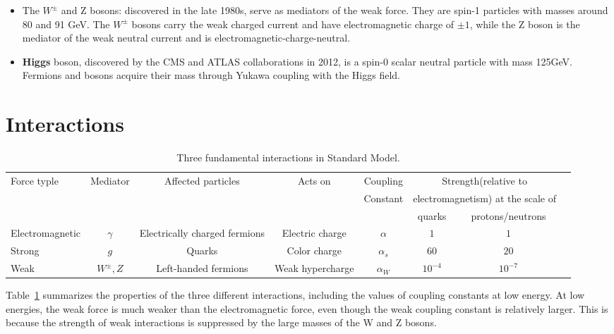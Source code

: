 \begin{itemize}
\begin{itemize}
  \item The $W^{\pm}$ and Z bosons: discovered in the late 1980s, serve as mediators of the weak force. They are spin-1 particles with masses around 80 and 91 GeV. The \textbf{$W^{\pm}$} bosons carry the weak charged current and have electromagnetic charge of $\pm 1$, while the Z boson is the mediator of the weak neutral current and is electromagnetic-charge-neutral. 
    \item \textbf{Higgs} boson, discovered by the CMS and ATLAS collaborations in 2012\cite{Aad:2012tfa}\cite{Chatrchyan:2012xdj}, is a spin-0 scalar neutral particle with mass 125GeV. Fermions and bosons acquire their mass through Yukawa coupling with the Higgs field. 
\end{itemize}
\end{itemize}
 
 

\section{Interactions}
\begin{table}[tbh]
\centering
\tiny
\begin{tabular}{|l|c|c|c|c|c|c|c}

\hline
    Force typle & Mediator & Affected particles & Acts on & Coupling&  \multicolumn{2}{c|}{Strength(relative to }\\
    &&&&Constant &\multicolumn{2}{c|}{electromagnetism) at the scale of}\\ 
    \hline
   &&&&&quarks& protons/neutrons \\
\hline
\hline
    Electromagnetic & $\gamma$&Electrically charged fermions&Electric charge& $\alpha$ &$1$&$1$\\
    Strong  & $g$ &Quarks & Color charge& $\alpha_s$ &$60$&$20$\\
    Weak & $W^{\pm}, Z$ &Left-handed fermions & Weak hypercharge& $\alpha_W$ &$10^{-4}$&$10^{-7}$\\
\hline
\end{tabular}
\caption{Three fundamental interactions in Standard Model. }
\label{tab:forces}
\end{table}

\par Table~\ref{tab:forces} summarizes the properties of the three different interactions, including the values of coupling constants at low energy. 
At low energies, the weak force is much weaker than the electromagnetic force, even though the weak coupling constant is relatively larger. 
This is because the strength of weak interactions is suppressed by the large masses of the W and Z bosons. 

